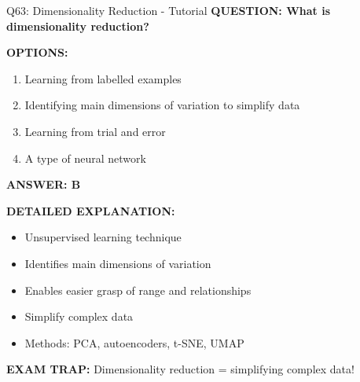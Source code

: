\documentclass[8pt]{beamer}
\begin{document}
	\begin{frame}{Q63: Dimensionality Reduction - Tutorial}
		\fontsize{6.5}{7.5}\selectfont
		\textbf{QUESTION: What is dimensionality reduction?}
		
		\vspace{0.1cm}
		\textbf{OPTIONS:}
		\begin{enumerate}
			\item Learning from labelled examples
			\item Identifying main dimensions of variation to simplify data
			\item Learning from trial and error
			\item A type of neural network
		\end{enumerate}
		
		\vspace{0.1cm}
		\textcolor{myblue}{\textbf{ANSWER: B}}
		
		\vspace{0.1cm}
		\textbf{DETAILED EXPLANATION:}
		\begin{itemize}
			\item Unsupervised learning technique
			\item Identifies main dimensions of variation
			\item Enables easier grasp of range and relationships
			\item Simplify complex data
			\item Methods: PCA, autoencoders, t-SNE, UMAP
		\end{itemize}
		
		\vspace{0.1cm}
		\textcolor{myred}{\textbf{EXAM TRAP:}} Dimensionality reduction = \textcolor{myblue}{simplifying complex data}!
	\end{frame}
	
\end{document}
